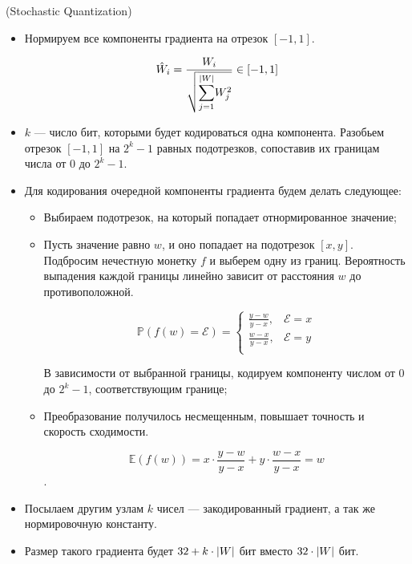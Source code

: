 \begin{algorithm}(Stochastic Quantization)
  \begin{itemize}
    \item Нормируем все компоненты градиента на отрезок $[-1, 1]$.

      $$\hat{W}_i
        = \frac{W_i}{\sqrt{\mathlarger{\sum_{j = 1}^{\abs{W}}}W_j^2}}
        \in [-1, 1]$$
    \item $k$ --- число бит, которыми будет кодироваться одна компонента.
      Разобьем отрезок $[-1, 1]$ на $2^k - 1$ равных подотрезков, сопоставив
      их границам числа от $0$ до $2^k - 1$.
    \item Для кодирования очередной компоненты градиента будем делать следующее:
      \begin{itemize}
        \item Выбираем подотрезок, на который попадает отнормированное значение;
        \item Пусть значение равно $w$, и оно попадает на подотрезок $[x, y]$.
          Подбросим нечестную монетку $f$ и выберем одну из границ. Вероятность
          выпадения каждой границы линейно зависит от расстояния $w$ до
          противоположной.

          $$\mathbb{P}(f(w) = \mathcal{E}) =
            \begin{cases}
              \frac{y - w}{y - x}, & \mathcal{E} = x \\
              \frac{w - x}{y - x}, & \mathcal{E} = y \\
            \end{cases}$$

          В зависимости от выбранной границы, кодируем компоненту числом от $0$
          до $2^k - 1$, соответствующим границе;
        \item Преобразование получилось несмещенным, повышает точность и скорость сходимости.

          $$\mathbb{E}(f(w)) = x \cdot \frac{y - w}{y - x} + y \cdot
            \frac{w - x}{y - x} = w$$.

      \end{itemize}
      \item Посылаем другим узлам $k$ чисел --- закодированный градиент, а так же нормировочную  константу.
      \item Размер такого градиента будет $32 + k \cdot \lvert W\rvert$ бит вместо
        $32 \cdot \lvert W\rvert$ бит.
  \end{itemize}
\end{algorithm}

